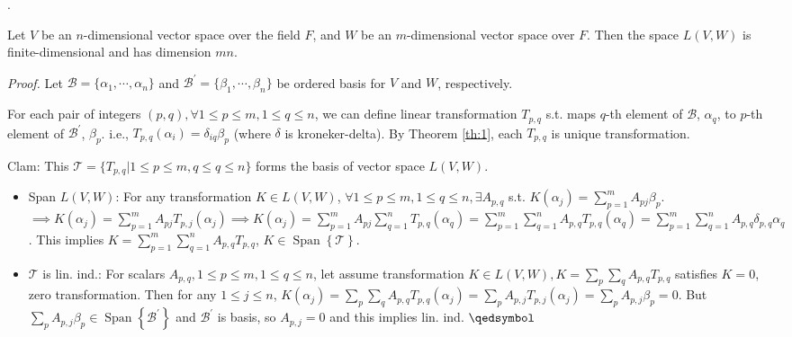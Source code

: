 \documentclass[8pt]{beamer}
\newcommand{\mc}[1]{\mathcal{#1}}
\newcommand{\ti}[1]{\textit{#1}}
\newcommand{\Span}[1]{\operatorname{Span}\!\left\{#1\right\}}
\begin{document}
\begin{frame}{.}
    \begin{theorem}
        Let $V$ be an $n$-dimensional vector space over the field $F$, and $W$ be an $m$-dimensional vector space over $F$. Then the space $L(V,W)$ is finite-dimensional and has dimension $mn$.
    \end{theorem}

    \ti{Proof.} Let $\mc{B} = \{\alpha_1, \cdots, \alpha_n\}$ and $\mc{B}^\prime = \{\beta_1, \cdots, \beta_n\}$ be ordered basis for $V$ and $W$, respectively.

    For each pair of integers $(p,q), \forall 1 \leq p \leq m, 1 \leq q \leq n$, we can define linear transformation $T_{p,q}$ s.t. maps $q$-th element of $\mc{B}$, $\alpha_q$, to  $p$-th element of $\mc{B}^\prime$, $\beta_p$. i.e., $T_{p,q}(\alpha_i) = \delta_{iq} \beta_p$ (where $\delta$ is kroneker-delta). By Theorem \ref{th:1}, each $T_{p,q}$ is unique transformation.

    Clam: This $\mc{T} = \{T_{p,q}| 1\leq p \leq m, q \leq q \leq n\}$ forms the basis of vector space $L(V,W)$.
    \begin{itemize}
        \item Span $L(V,W)$: For any transformation $K \in L(V,W)$, $\forall 1\leq p \leq m, 1 \leq q \leq n, \exists A_{p,q}$ s.t. $K(\alpha_j) = \sum_{p=1}^m A_{pj} \beta_p$. $\implies K(\alpha_j) = \sum_{p=1}^m A_{pj} T_{p,j}(\alpha_j) \implies K(\alpha_j) = \sum_{p=1}^m A_{pj} \sum_{q=1}^n T_{p,q}(\alpha_q) = \sum_{p=1}^m \sum_{q=1}^n A_{p,q} T_{p,q} (\alpha_q) = \sum_{p=1}^m \sum_{q=1}^n A_{p,q} \delta_{p,q}\alpha_q$. This implies $K = \sum_{p=1}^m \sum_{q=1}^n A_{p,q} T_{p,q}$, $K \in \Span{\mc{T}}$.
        \item $\mc{T}$ is lin. ind.: For scalars $A_{p,q}, 1\leq p \leq m, 1 \leq q \leq n $, let assume transformation $K \in L(V,W), K = \sum_p \sum_q A_{p,q} T_{p,q}$ satisfies $K = 0$, zero transformation. Then for any $1\leq j \leq n$, $K(\alpha_j) = \sum_{p}\sum_q A_{p,q} T_{p,q} (\alpha_j) = \sum_p A_{p,j} T_{p,j} (\alpha_j) = \sum_p A_{p,j} \beta_p= 0$. But $\sum_p A_{p,j} \beta_p \in \Span{\mc{B}^\prime}$ and $\mc{B}^\prime$ is basis, so $A_{p,j}=0$ and this implies lin. ind. $\qedsymbol$
    \end{itemize}

\end{frame}
\end{document}
